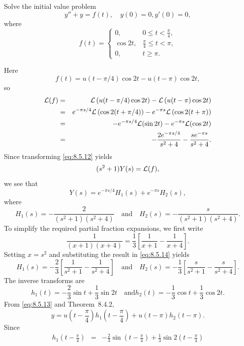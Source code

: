 \documentclass{ximera}
\begin{document}
\begin{example}\label{example:8.5.4}
 Solve the initial value problem
\begin{equation}\label{eq:8.5.12}
y''+y=f(t), \quad   y(0)=0,  y'(0)=0,
\end{equation}
where
$$
f(t)=\left\{\begin{array}{cl}
 0,&0\leq t<\frac{\pi}{4},\\
\cos2t,&\frac{\pi}{4}\leq t<\pi,\\
 0,&t\geq\pi.
\end{array}\right.
$$
\begin{explanation}
Here
$$
f(t)=u(t-\pi/4)\cos2t-u(t-\pi)\cos2t,
$$
so
\begin{eqnarray*}
{\cal L}(f)&=&{\cal L}\left(u(t-\pi/4)\cos2t\right)-{\cal L}\left(u(t-\pi)\cos2t\right)\\
&=&e^{-{\pi s/4}}{\cal L}\left(\cos2(t+\pi/4)\right)-e^{-\pi s}{\cal L}\left(\cos2(t+\pi)\right)\\
&=&-e^{-{\pi s/4}}{\cal L}(\sin2t)-e^{-\pi s}
{\cal L}(\cos2t)\\
&=&-\frac{2e^{-{\pi s/ 4}}}{s^2+4}-\frac{se^{-\pi s}}{s^2+4}.
\end{eqnarray*}
Since transforming \eqref{eq:8.5.12} yields
$$
(s^2+1)Y(s)={\cal L}(f),
$$
we see that
\begin{equation}\label{eq:8.5.13}
Y(s)=e^{-{\pi s/ 4}} H_1(s)+e^{-\pi s} H_2(s),
\end{equation}
where
\begin{equation}\label{eq:8.5.14}
H_1(s)=-\frac{2}{(s^2+1)(s^2+4)}\quad\mbox{and}\quad H_2(s)=-\frac{s}{(s^2+1)(s^2+4)}.
\end{equation}
To simplify the required partial fraction expansions, we first write
$$
\frac{1}{(x+1)(x+4)}=\frac{1}{3}\left[\frac{1}{x+1}-\frac{1}{x+4}\right].
$$
Setting $x=s^2$ and substituting the result in  \eqref{eq:8.5.14} yields
$$
H_1(s)=-\frac{2}{3}\left[\frac{1}{s^2+1}-\frac{1}{s^2+4}\right]
\quad\mbox{and}\quad
H_2(s)=-\frac{1}{3}\left[\frac{s}{s^2+1}-\frac{s}{s^2+4}\right].
$$
The inverse transforms are
$$
h_1(t)=-\frac{2}{3}\sin t+\frac{1}{3}\sin2t
\quad\mbox{and}
h_2(t)=-\frac{1}{3}\cos t+\frac{1}{3}\cos2t.
$$
From  \eqref{eq:8.5.13} and Theorem~8.4.2,
\begin{equation}\label{eq:8.5.15}
y=u\left(t-\frac{\pi}{4}\right) h_1\left(t-\frac{\pi}{4}\right)+
u(t-\pi) h_2(t-\pi).
\end{equation}
Since
\begin{eqnarray*}
h_1\left(t-\frac{\pi}{4}\right)&=&-\frac{2}{3}\sin\left(t-\frac{\pi}{4}\right)+\frac{1}{3}\sin2\left(t-\frac{\pi}{4}\right)\\

\end{eqnarray*}
\end{explanation}
\end{example}
\end{document}
